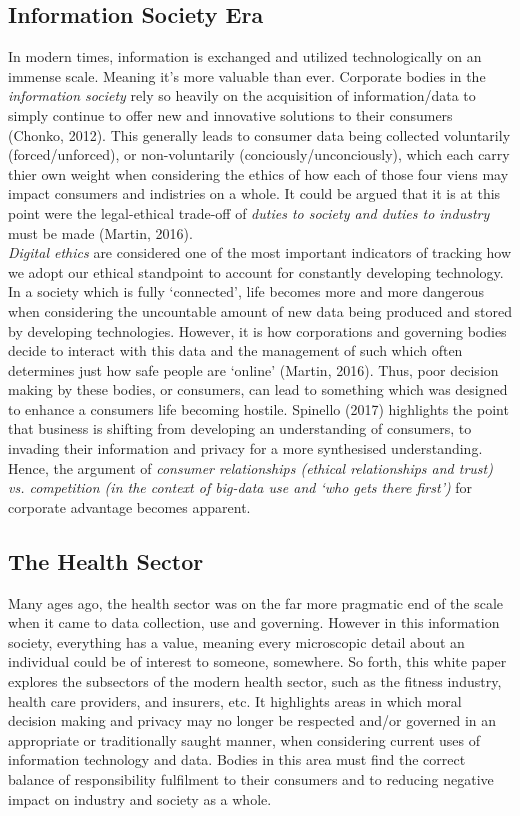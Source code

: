 \documentclass[11pt, english]{article}
\begin{document}
	\subsection{Information Society Era}

	In modern times, information is exchanged and utilized technologically on an immense scale. Meaning it's more valuable than ever. Corporate bodies in the \textit{information society} rely so heavily on the acquisition of information/data to simply continue to offer new and innovative solutions to their consumers (Chonko, 2012). This generally leads to consumer data being collected voluntarily (forced/unforced), or non-voluntarily (conciously/unconciously), which each carry thier own weight when considering the ethics of how each of those four viens may impact consumers and indistries on a whole. It could be argued that it is at this point were the legal-ethical trade-off of \textit{duties to society and duties to industry} must be made (Martin, 2016).\\

	\textit{Digital ethics} are considered one of the most important indicators of tracking how we adopt our ethical standpoint to account for constantly developing technology. In a society which is fully `connected', life becomes more and more dangerous when considering the uncountable amount of new data being produced and stored by developing technologies. However, it is how corporations and governing bodies decide to interact with this data and the management of such which often determines just how safe people are `online' (Martin, 2016). Thus, poor decision making by these bodies, or consumers, can lead to something which was designed to enhance a consumers life becoming hostile. Spinello (2017) highlights the point that business is shifting from developing an understanding of consumers, to invading their information and privacy for a more synthesised understanding. Hence, the argument of \textit{consumer relationships (ethical relationships and trust) vs. competition (in the context of big-data use and `who gets there first')} for corporate advantage becomes apparent.

	\subsection{The Health Sector}

	Many ages ago, the health sector was on the far more pragmatic end of the scale when it came to data collection, use and governing. However in this information society, everything has a value, meaning every microscopic detail about an individual could be of interest to someone, somewhere. So forth, this white paper explores the subsectors of the modern health sector, such as the fitness industry, health care providers, and insurers, etc. It highlights areas in which moral decision making and privacy may no longer be respected and/or governed in an appropriate or traditionally saught manner, when considering current uses of information technology and data. Bodies in this area must find the correct balance of responsibility fulfilment to their consumers and to reducing negative impact on industry and society as a whole.
\end{document}
